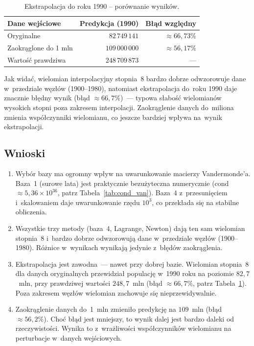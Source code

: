 \documentclass[12pt, a4paper]{article}
\begin{document}
\begin{table}[H]
  \centering
  \caption{Ekstrapolacja do roku 1990 -- porównanie wyników.}
  \begin{tabular}{lrr}
    \toprule
    Dane wejściowe & Predykcja (1990) & Błąd względny \\
    \midrule
    Oryginalne            & $82\,749\,141$  & $\approx 66{,}73\%$ \\
    Zaokrąglone do 1 mln  & $109\,000\,000$ & $\approx 56{,}17\%$   \\
    Wartość prawdziwa     & $248\,709\,873$ & ---                 \\
    \bottomrule
  \end{tabular}
  \label{tab:ekstrapolacja}
\end{table}

\noindent
Jak widać, wielomian interpolacyjny stopnia~8 bardzo dobrze odwzorowuje
dane w~przedziale węzłów (1900--1980), natomiast ekstrapolacja do~roku 1990
daje znacznie błędny wynik (błąd $\approx 66{,}7\%$)~--- typowa słabość
wielomianów wysokich stopni poza zakresem interpolacji. Zaokrąglenie danych
do~miliona zmienia współczynniki wielomianu, co jeszcze bardziej wpływa
na~wynik ekstrapolacji.


\subsection{Wnioski}

\begin{enumerate}
  \item Wybór bazy ma ogromny wpływ na uwarunkowanie macierzy Vandermonde'a.
        Baza~1 (surowe lata) jest praktycznie bezużyteczna numerycznie
        (cond $\approx 5{,}36 \times 10^{36}$, patrz Tabela~\ref{tab:cond_van}).
        Baza~4 z~przesunięciem i~skalowaniem daje uwarunkowanie rzędu $10^3$,
        co przekłada się na stabilne obliczenia.

  \item Wszystkie trzy metody (baza~4, Lagrange, Newton) dają ten sam wielomian
        stopnia~8 i~bardzo dobrze odwzorowują dane w~przedziale węzłów
        (1900--1980). Różnice w~wynikach wynikają jedynie z~błędów zaokrąglenia.

  \item Ekstrapolacja jest zawodna~--- nawet przy dobrej bazie. Wielomian
        stopnia~8 dla danych oryginalnych przewidział populację w~1990 roku
        na poziomie $82{,}7$~mln, przy prawdziwej wartości $248{,}7$~mln
        (błąd $\approx 66{,}7\%$, patrz Tabela~\ref{tab:ekstrapolacja}).
        Poza zakresem węzłów wielomian zachowuje się nieprzewidywalnie.

  \item Zaokrąglenie danych do~1~mln zmieniło predykcję na $109$~mln
        (błąd $\approx 56{,}2\%$). Choć błąd jest mniejszy, to wynik dalej
        jest bardzo daleki od rzeczywistości. Wynika to z~wrażliwości
        współczynników wielomianu na perturbacje w~danych wejściowych.
\end{enumerate}
\end{document}
